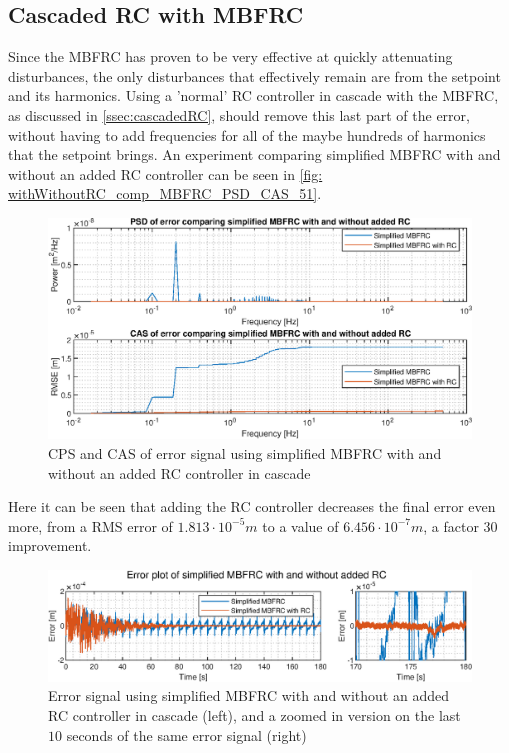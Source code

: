 \documentclass[journal]{IEEEtran}
\begin{document}
\subsection{Cascaded RC with MBFRC}
Since the MBFRC has proven to be very effective at quickly attenuating disturbances, the only disturbances that effectively remain are from the setpoint and its harmonics. Using a 'normal' RC controller in cascade with the MBFRC, as discussed in \autoref{ssec:cascadedRC}, should remove this last part of the error, without having to add frequencies for all of the maybe hundreds of harmonics that the setpoint brings. An experiment comparing simplified MBFRC with and without an added RC controller can be seen in \autoref{fig: withWithoutRC_comp_MBFRC_PSD_CAS_51}.
\begin{figure}
    \centering
    \includegraphics[width=0.9\linewidth]{figures/simple_RC_MBFRC/comp_48freq_PSD_CAS_2.eps}
    \caption{CPS and CAS of error signal using simplified MBFRC with and without an added RC controller in cascade}
    \label{fig: withWithoutRC_comp_MBFRC_PSD_CAS_51}
\end{figure}
Here it can be seen that adding the RC controller decreases the final error even more, from a RMS error of $1.813\cdot10^{-5}m$ to a value of $6.456\cdot10^{-7}m$, a factor 30 improvement.
\begin{figure}
    \centering
    \includegraphics[width=1\linewidth]{figures/simple_RC_MBFRC/comp_48freq_Err_2.eps}
    \caption{Error signal using simplified MBFRC with and without an added RC controller in cascade (left), and a zoomed in version on the last $10$ seconds of the same error signal (right)}
    \label{fig: long_nonsimple_MBFRC_48_errsig}
\end{figure}
\end{document}
